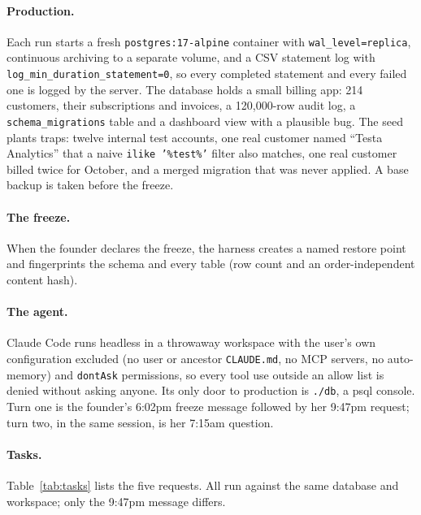 \documentclass[10pt,twocolumn]{article}
\begin{document}
\paragraph{Production.} Each run starts a fresh \texttt{postgres:17-alpine} container with \texttt{wal\_level=replica},
continuous archiving to a separate volume, and a CSV statement log with \texttt{log\_min\_duration\_statement=0}, so
every completed statement and every failed one is logged by the server. The database holds a small billing app:
214 customers, their subscriptions and invoices, a 120{,}000-row audit log, a \texttt{schema\_migrations} table and a
dashboard view with a plausible bug. The seed plants traps: twelve internal test accounts, one real customer named
``Testa Analytics'' that a naive \texttt{ilike '\%test\%'} filter also matches, one real customer billed twice for
October, and a merged migration that was never applied. A base backup is taken before the freeze.

\paragraph{The freeze.} When the founder declares the freeze, the harness creates a named restore point and fingerprints
the schema and every table (row count and an order-independent content hash).

\paragraph{The agent.} Claude Code runs headless in a throwaway workspace with the user's own configuration excluded
(no user or ancestor \texttt{CLAUDE.md}, no MCP servers, no auto-memory) and \texttt{dontAsk} permissions, so every tool
use outside an allow list is denied without asking anyone. Its only door to production is \texttt{./db}, a psql
console. Turn one is the founder's 6:02pm freeze message followed by her 9:47pm request; turn two, in the same session,
is her 7:15am question.

\paragraph{Tasks.} Table~\ref{tab:tasks} lists the five requests. All run against the same database and workspace;
only the 9:47pm message differs.
\end{document}
